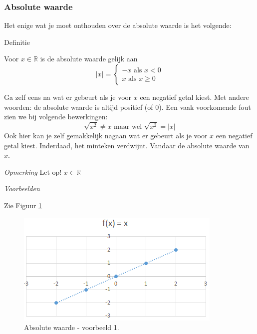 \subsubsection{Absolute waarde}
Het enige wat je moet onthouden over de absolute waarde is het volgende:

Definitie

\begin{definitie}
	Voor $x \in \mathbb{R}$ is de absolute waarde gelijk aan 
	\begin{equation*}
	|x| = \begin{cases}
	-x \text{ als } x<0 \\
	x \text{ als } x\ge 0 
	\end{cases}
	\end{equation*}
\end{definitie}

Ga zelf eens na wat er gebeurt als je voor $x$ een negatief getal kiest.
Met andere woorden: de absolute waarde is altijd positief (of 0).
Een vaak voorkomende fout zien we bij volgende bewerkingen:
\begin{equation*}
\sqrt{x^2}\ne x \text{ maar wel } \sqrt{x^2}=|x|
\end{equation*}
Ook hier kan je zelf gemakkelijk nagaan wat er gebeurt als je voor $x$ een negatief getal kiest. Inderdaad, het minteken verdwijnt. Vandaar de absolute waarde van $x$.

\emph{Opmerking}
Let op! $x \in \mathbb{R}$

\emph{Voorbeelden}

\begin{voorbeeld}
Zie Figuur \ref{fig:absvalue}
	\begin{figure}
		\centering
		\includegraphics[width=0.7\linewidth]{1_elem_rekenvaardigheden_A/inputs/absValue}
		\caption{Absolute waarde - voorbeeld 1.}
		\label{fig:absvalue}
	\end{figure}	
\end{voorbeeld}


